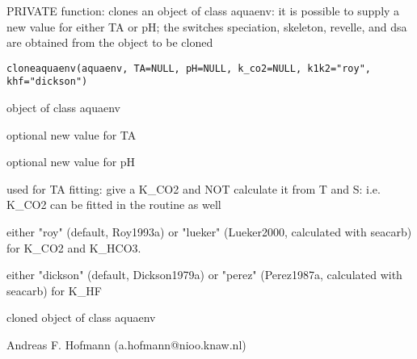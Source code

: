 \documentclass{article}
\begin{document}
\begin{Description}\relax
PRIVATE function: clones an object of class aquaenv: it is possible to supply a new value for either TA or pH; the switches speciation, skeleton, revelle, and dsa are obtained from the object to be cloned
\end{Description}
\begin{Usage}
\begin{verbatim}cloneaquaenv(aquaenv, TA=NULL, pH=NULL, k_co2=NULL, k1k2="roy", khf="dickson")\end{verbatim}
\end{Usage}
\begin{Arguments}
\begin{ldescription}
\item[\code{aquaenv }] object of class aquaenv
\item[\code{TA }] optional new value for TA
\item[\code{pH }] optional new value for pH
\item[\code{k\_co2}] used for TA fitting: give a K\_CO2 and NOT calculate it from T and S: i.e. K\_CO2 can be fitted in the routine as well
\item[\code{k1k2}] either "roy" (default, Roy1993a) or "lueker" (Lueker2000, calculated with seacarb) for K\_CO2 and K\_HCO3.
\item[\code{khf}] either "dickson" (default, Dickson1979a) or "perez" (Perez1987a, calculated with seacarb) for K\_HF
\end{ldescription}
\end{Arguments}
\begin{Value}
cloned object of class aquaenv
\end{Value}
\begin{Author}\relax
Andreas F. Hofmann (a.hofmann@nioo.knaw.nl)
\end{Author}
\end{document}
